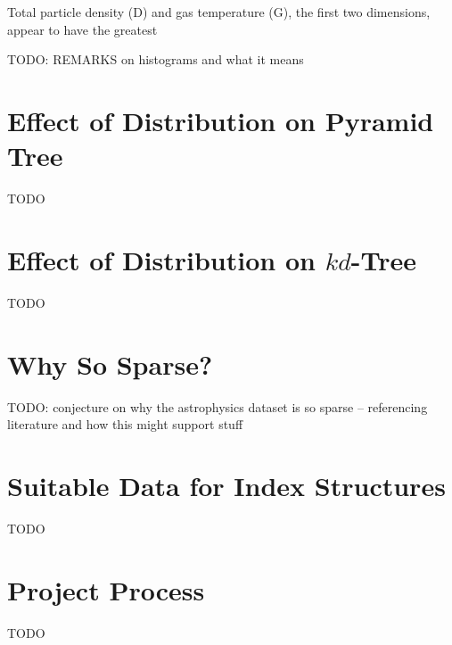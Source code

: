Total particle density (D) and gas temperature (G), the first two dimensions, appear to have the greatest

TODO: REMARKS on histograms and what it means

\section{Effect of Distribution on Pyramid Tree}

TODO

\section{Effect of Distribution on $kd$-Tree}

TODO

\section{Why So Sparse?}

TODO: conjecture on why the astrophysics dataset is so sparse -- referencing literature and how this might support stuff

\section{Suitable Data for Index Structures}

TODO

\section{Project Process}

TODO